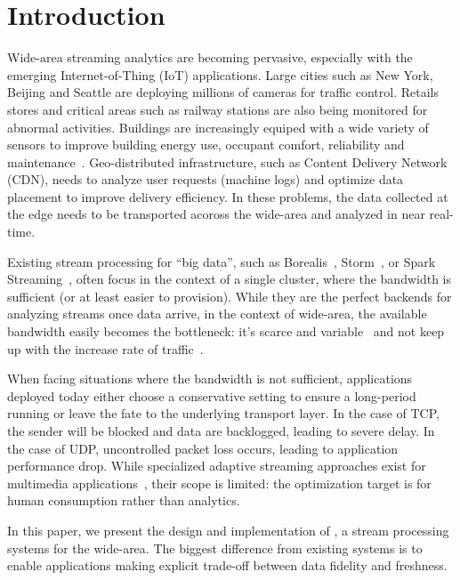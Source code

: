 \section{Introduction}
\label{sec:introduction}

Wide-area streaming analytics are becoming pervasive, especially with the
emerging Internet-of-Thing (IoT) applications. Large cities such as New York,
Beijing and Seattle are deploying millions of cameras for traffic
control. Retails stores and critical areas such as railway stations are also
being monitored for abnormal activities. Buildings are increasingly equiped with
a wide variety of sensors to improve building energy use, occupant comfort,
reliability and maintenance~\cite{krioukov2012building}. Geo-distributed
infrastructure, such as Content Delivery Network (CDN), needs to analyze user
requests (machine logs) and optimize data placement to improve delivery
efficiency. In these problems, the data collected at the edge needs to be
transported acoross the wide-area and analyzed in near real-time.

Existing stream processing for ``big data'', such as
Borealis~\cite{abadi2005design}, Storm~\cite{toshniwal2014storm}, or Spark
Streaming~\cite{zaharia2012discretized}, often focus in the context of a single
cluster, where the bandwidth is sufficient (or at least easier to
provision). While they are the perfect backends for analyzing streams once data
arrive, in the context of wide-area, the available bandwidth easily becomes the
bottleneck: it's scarce and variable~\cite{rabkin2014aggregation} and not keep
up with the increase rate of traffic~\cite{index2013zettabyte}.

When facing situations where the bandwidth is not sufficient, applications
deployed today either choose a conservative setting to ensure a long-period
running or leave the fate to the underlying transport layer. In the case of TCP,
the sender will be blocked and data are backlogged, leading to severe delay. In
the case of UDP, uncontrolled packet loss occurs, leading to application
performance drop. While specialized adaptive streaming approaches exist for
multimedia applications~\cite{michalos2012dynamic, schulzrinne1998real}, their
scope is limited: the optimization target is for human consumption rather than
analytics.

In this paper, we present the design and implementation of \sysname{}, a stream
processing systems for the wide-area. The biggest difference from existing
systems is to enable applications making explicit trade-off between data
fidelity and freshness.

